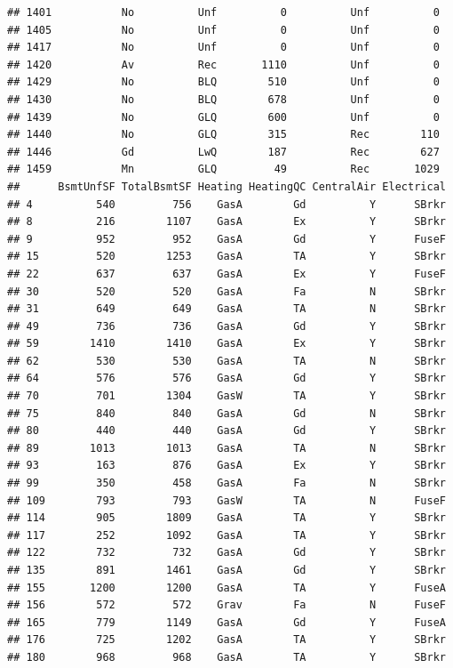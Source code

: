 \documentclass[]{article}
\begin{document}
\begin{verbatim}
## 1401           No          Unf          0          Unf          0
## 1405           No          Unf          0          Unf          0
## 1417           No          Unf          0          Unf          0
## 1420           Av          Rec       1110          Unf          0
## 1429           No          BLQ        510          Unf          0
## 1430           No          BLQ        678          Unf          0
## 1439           No          GLQ        600          Unf          0
## 1440           No          GLQ        315          Rec        110
## 1446           Gd          LwQ        187          Rec        627
## 1459           Mn          GLQ         49          Rec       1029
##      BsmtUnfSF TotalBsmtSF Heating HeatingQC CentralAir Electrical
## 4          540         756    GasA        Gd          Y      SBrkr
## 8          216        1107    GasA        Ex          Y      SBrkr
## 9          952         952    GasA        Gd          Y      FuseF
## 15         520        1253    GasA        TA          Y      SBrkr
## 22         637         637    GasA        Ex          Y      FuseF
## 30         520         520    GasA        Fa          N      SBrkr
## 31         649         649    GasA        TA          N      SBrkr
## 49         736         736    GasA        Gd          Y      SBrkr
## 59        1410        1410    GasA        Ex          Y      SBrkr
## 62         530         530    GasA        TA          N      SBrkr
## 64         576         576    GasA        Gd          Y      SBrkr
## 70         701        1304    GasW        TA          Y      SBrkr
## 75         840         840    GasA        Gd          N      SBrkr
## 80         440         440    GasA        Gd          Y      SBrkr
## 89        1013        1013    GasA        TA          N      SBrkr
## 93         163         876    GasA        Ex          Y      SBrkr
## 99         350         458    GasA        Fa          N      SBrkr
## 109        793         793    GasW        TA          N      FuseF
## 114        905        1809    GasA        TA          Y      SBrkr
## 117        252        1092    GasA        TA          Y      SBrkr
## 122        732         732    GasA        Gd          Y      SBrkr
## 135        891        1461    GasA        Gd          Y      SBrkr
## 155       1200        1200    GasA        TA          Y      FuseA
## 156        572         572    Grav        Fa          N      FuseF
## 165        779        1149    GasA        Gd          Y      FuseA
## 176        725        1202    GasA        TA          Y      SBrkr
## 180        968         968    GasA        TA          Y      SBrkr

\end{verbatim}
\end{document}
